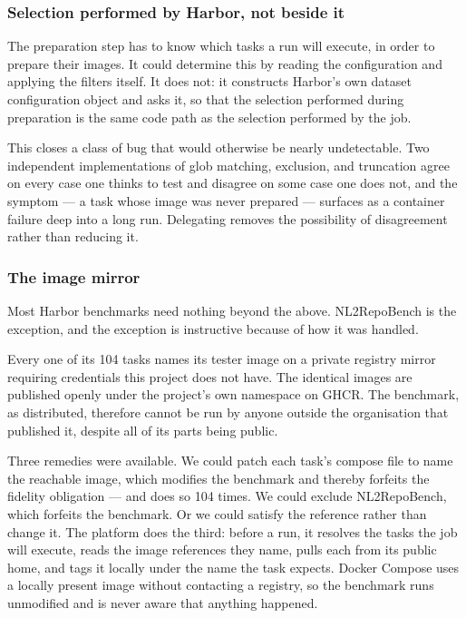 \subsubsection{Selection performed by Harbor, not beside it}

The preparation step has to know which tasks a run will execute, in order to
prepare their images. It could determine this by reading the configuration and
applying the filters itself. It does not: it constructs Harbor's own dataset
configuration object and asks it, so that the selection performed during
preparation is the same code path as the selection performed by the job.

This closes a class of bug that would otherwise be nearly undetectable. Two
independent implementations of glob matching, exclusion, and truncation agree
on every case one thinks to test and disagree on some case one does not, and
the symptom --- a task whose image was never prepared --- surfaces as a
container failure deep into a long run. Delegating removes the possibility of
disagreement rather than reducing it.

\subsubsection{The image mirror}

Most Harbor benchmarks need nothing beyond the above. NL2RepoBench is the
exception, and the exception is instructive because of how it was handled.

Every one of its 104 tasks names its tester image on a private registry mirror
requiring credentials this project does not have. The identical images are
published openly under the project's own namespace on GHCR. The benchmark, as
distributed, therefore cannot be run by anyone outside the organisation that
published it, despite all of its parts being public.

Three remedies were available. We could patch each task's compose file to name
the reachable image, which modifies the benchmark and thereby forfeits the
fidelity obligation --- and does so 104 times. We could exclude NL2RepoBench,
which forfeits the benchmark. Or we could satisfy the reference rather than
change it. The platform does the third: before a run, it resolves the tasks the
job will execute, reads the image references they name, pulls each from its
public home, and tags it locally under the name the task expects. Docker
Compose uses a locally present image without contacting a registry, so the
benchmark runs unmodified and is never aware that anything happened.

